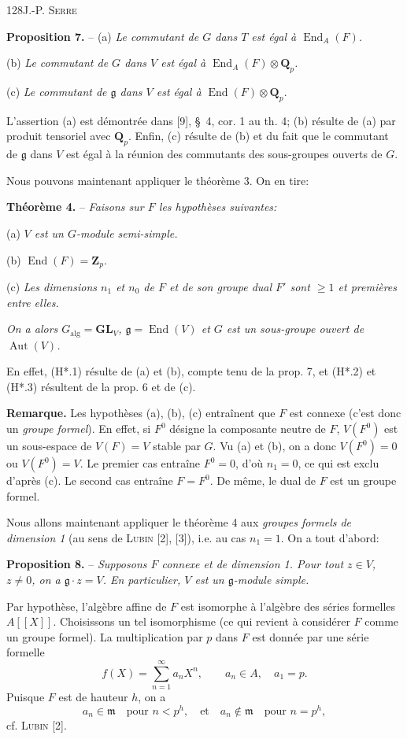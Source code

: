 128\hfill J.-P. \textsc{Serre}

\textbf{Proposition 7.} -- (a) \textit{Le commutant de $G$ dans $T$ est égal à $\operatorname{End}_A(F)$.}

(b) \textit{Le commutant de $G$ dans $V$ est égal à $\operatorname{End}_A(F)\otimes\mathbf Q_p$.}

(c) \textit{Le commutant de $\mathfrak g$ dans $V$ est égal à $\operatorname{End}(F)\otimes\mathbf Q_p$.}

L'assertion (a) est démontrée dans [9], \S\ 4, cor. 1 au th. 4; (b) résulte de (a) par produit tensoriel avec $\mathbf Q_p$. Enfin, (c) résulte de (b) et du fait que le commutant de $\mathfrak g$ dans $V$ est égal à la réunion des commutants des sous-groupes ouverts de $G$.

Nous pouvons maintenant appliquer le théorème 3. On en tire:

\textbf{Théorème 4.} -- \textit{Faisons sur $F$ les hypothèses suivantes:}

(a) \textit{$V$ est un $G$-module semi-simple.}

(b) $\operatorname{End}(F)=\mathbf Z_p$.

(c) \textit{Les dimensions $n_1$ et $n_0$ de $F$ et de son groupe dual $F'$ sont $\geq1$ et premières entre elles.}

\textit{On a alors $G_{\mathrm{alg}}=\mathbf{GL}_V$, $\mathfrak g=\operatorname{End}(V)$ et $G$ est un sous-groupe ouvert de $\operatorname{Aut}(V)$.}

En effet, (H*.1) résulte de (a) et (b), compte tenu de la prop. 7, et (H*.2) et (H*.3) résultent de la prop. 6 et de (c).

\textbf{Remarque.} Les hypothèses (a), (b), (c) entraînent que $F$ est connexe (c'est donc un \textit{groupe formel}). En effet, si $F^0$ désigne la composante neutre de $F$, $V(F^0)$ est un sous-espace de $V(F)=V$ stable par $G$. Vu (a) et (b), on a donc $V(F^0)=0$ ou $V(F^0)=V$. Le premier cas entraîne $F^0=0$, d'où $n_1=0$, ce qui est exclu d'après (c). Le second cas entraîne $F=F^0$. De même, le dual de $F$ est un groupe formel.

Nous allons maintenant appliquer le théorème 4 aux \textit{groupes formels de dimension 1} (au sens de \textsc{Lubin} [2], [3]), i.e. au cas $n_1=1$. On a tout d'abord:

\textbf{Proposition 8.} -- \textit{Supposons $F$ connexe et de dimension 1. Pour tout $z\in V$, $z\ne0$, on a $\mathfrak g\cdot z=V$. En particulier, $V$ est un $\mathfrak g$-module simple.}

Par hypothèse, l'algèbre affine de $F$ est isomorphe à l'algèbre des séries formelles $A[[X]]$. Choisissons un tel isomorphisme (ce qui revient à considérer $F$ comme un groupe formel). La multiplication par $p$ dans $F$ est donnée par une série formelle
\[
f(X)=\sum_{n=1}^{\infty}a_nX^n,\qquad a_n\in A,\quad a_1=p.
\]
Puisque $F$ est de hauteur $h$, on a
\[
a_n\in\mathfrak m\quad\text{pour }n<p^h,\quad\text{et}\quad a_n\notin\mathfrak m\quad\text{pour }n=p^h,
\]
cf. \textsc{Lubin} [2].
